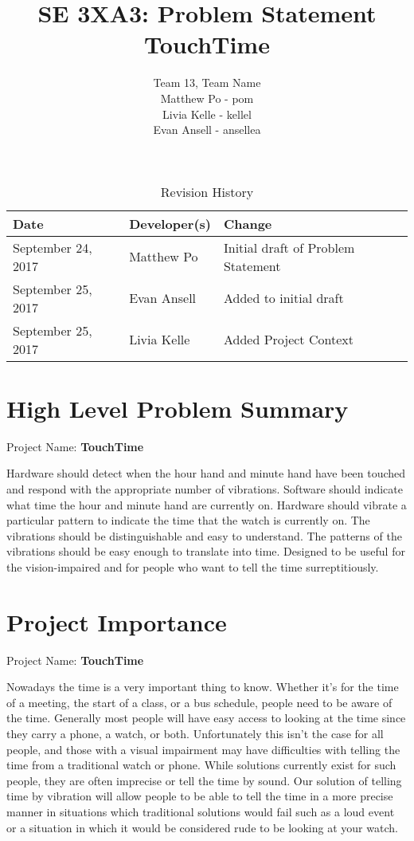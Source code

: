 \documentclass{article}
\title{SE 3XA3: Problem Statement\\TouchTime}
\author{Team 13, Team Name
		\\ Matthew Po - pom
		\\ Livia Kelle - kellel
		\\ Evan Ansell - ansellea
}
\date{}
\begin{document}
\begin{table}[hp]
\caption{Revision History} \label{TblRevisionHistory}
\begin{tabularx}{\textwidth}{llX}
\toprule
\textbf{Date} & \textbf{Developer(s)} & \textbf{Change}\\
\midrule
September 24, 2017 & Matthew Po & Initial draft of Problem Statement\\
September 25, 2017 & Evan Ansell & Added to initial draft\\
September 25, 2017 & Livia Kelle & Added Project Context\\
\bottomrule
\end{tabularx}
\end{table}

\newpage

\maketitle

\section{High Level Problem Summary}
Project Name: 
\textbf{TouchTime}
\vspace{0.3cm}

Hardware should detect when the hour hand and minute hand have been touched and respond with the appropriate number of vibrations. Software should indicate what time the hour and minute hand are currently on. Hardware should vibrate a particular pattern to indicate the time that the watch is currently on. The vibrations should be distinguishable and easy to understand. The patterns of the vibrations should be easy enough to translate into time. Designed to be useful for the vision-impaired and for people who want to tell the time surreptitiously.
\vspace{0.3cm}

\section{Project Importance}
Project Name: 
\textbf{TouchTime}
\vspace{0.3cm}

Nowadays the time is a very important thing to know. Whether it's for the time of a  meeting, the start of a class, or a bus schedule, people need to be aware of the time. Generally most people will have easy access to looking at the time since they carry a phone, a watch, or both. Unfortunately this isn't the case for all people, and those with a visual impairment may have difficulties with telling the time from a traditional watch or phone. While solutions currently exist for such people, they are often imprecise or tell the time by sound. Our solution of telling time by vibration will allow people to be able to tell the time in a more precise manner in situations which traditional solutions would fail such as a loud event or a situation in which it would be considered rude to be looking at your watch.
\vspace{0.3cm}
\end{document}

